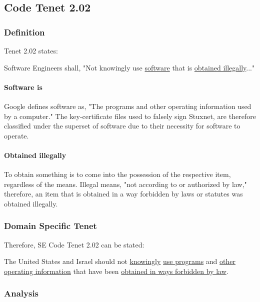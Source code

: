 \documentclass[12pt]{article}
\begin{document}
\begin{multicols}{2}
\subsection{Code Tenet 2.02}

\subsubsection{Definition}

Tenet 2.02 states:
\begin{framed}
Software Engineers shall, "Not knowingly use \underline{software} that is \underline{obtained illegally}..."\cite{softwareEngineeringCodeOfEthics}
\end{framed}

\paragraph{Software is}
Google defines software as, "The programs and other operating information used by a computer."\cite{softwareDefinition} The key-certificate files used to falsely sign Stuxnet, are therefore classified under the superset of software due to their necessity for software to operate.

\paragraph{Obtained illegally}
To obtain something is to come into the possession of the respective item, regardless of the means. Illegal means, "not according to or authorized by law," therefore, an item that is obtained in a way forbidden by laws or statutes was obtained illegally.\cite{illegalDefinition}

\subsubsection{Domain Specific Tenet}

Therefore, SE Code Tenet 2.02 can be stated:
\begin{framed}
The United States and Israel should not \ul{knowingly} \ul{use programs} and \ul{other operating information} that have been \ul{obtained in ways forbidden by law}. 
\end{framed}

\subsubsection{Analysis}


\end{multicols}
\end{document}
